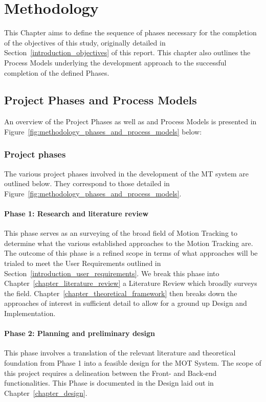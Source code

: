 \chapter{Methodology}\label{methodology}
This Chapter aims to define the sequence of phases necessary for the completion
of the objectives of this study, originally detailed in Section~\ref{introduction_objectives} of this report.
This chapter also outlines the Process Models underlying the development
approach to the successful completion of the defined Phases.

\section{Project Phases and Process Models }
An overview of the Project Phases as well as and Process Models is presented in
Figure~\ref{fig:methodology_phases_and_process_models} below:

\subsection{Project phases}
The various project phases involved in the development of the MT system are
outlined below. They correspond to those detailed in
Figure~\ref{fig:methodology_phases_and_process_models}.

\subsubsection{Phase 1: Research and literature review}
This phase serves as an surveying of the broad field of Motion Tracking to
determine what the various established approaches to the Motion Tracking are.
The outcome of this phase is a refined scope in terms of what approaches will be
trialed to meet the User Requirements outlined in
Section~\ref{introduction_user_requirements}. We break this phase into
Chapter~\ref{chapter_literature_review} a Literature Review which broadly
surveys the field. Chapter~\ref{chapter_theoretical_framework} then breaks down
the approaches of interest in sufficient detail to allow for a ground up Design
and Implementation.

\subsubsection{Phase 2: Planning and preliminary design}
This phase involves a translation of the relevant literature and theoretical
foundation from Phase 1 into a feasible design for the MOT System. The scope of
this project requires a delineation between the Front- and Back-end
functionalities. This Phase is documented in the Design laid out in
Chapter~\ref{chapter_design}.

